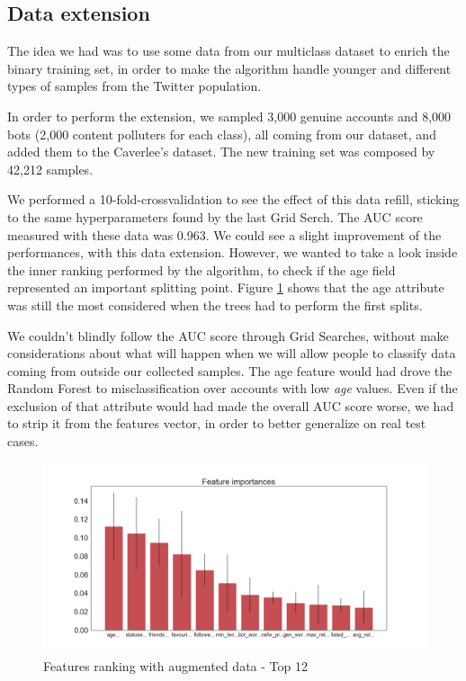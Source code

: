 \subsection{Data extension}
The idea we had was to use some data from our multiclass dataset to enrich the binary training set, in order to make the algorithm handle younger and different types of samples from the Twitter population.

In order to perform the extension, we sampled 3,000 genuine accounts and 8,000 bots (2,000 content polluters for each class), all coming from our dataset, and added them to the Caverlee's dataset.
The new training set was composed by 42,212 samples.

We performed a 10-fold-crossvalidation to see the effect of this data refill, sticking to the same hyperparameters found by the last Grid Serch. The AUC score measured with these data was 0.963. We could see a slight improvement of the performances, with this data extension. However, we wanted to take a look inside the inner ranking performed by the algorithm, to check if the age field represented an important splitting point.
Figure \ref{fig:bon_importances_ext} shows that the age attribute was still the most considered when the trees had to perform the first splits.

We couldn't blindly follow the AUC score through Grid Searches, without make considerations about what will happen when we will allow people to classify data coming from outside our collected samples.
The age feature would had drove the Random Forest to misclassification over accounts with low \textit{age} values.
Even if the exclusion of that attribute would had made the overall AUC score worse, we had to strip it from the features vector, in order to better generalize on real test cases.

\begin{figure}[htp!]
	\centering
	\includegraphics[width=\columnwidth]{chapter5/figure/bon_importances_extensions.png}
	\caption{Features ranking with augmented data - Top 12 }
	\label{fig:bon_importances_ext}
\end{figure}


